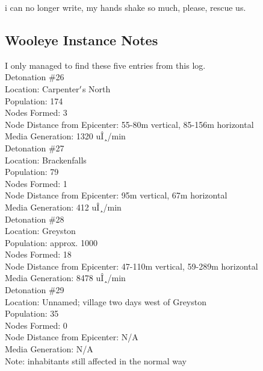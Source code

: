 \documentclass[12pt]{article}
\begin{document}
  
    i can no longer write, my hands shake so much, please, rescue us.\\

\newpage

\label{sec:lore/experiment1}
\subsection*{Wooleye Instance Notes}


  
    I only managed to find these five entries from this log.\\Detonation \#26\\Location: Carpenter$\rq$s North\\Population: 174\\Nodes Formed: 3\\Node Distance from Epicenter: 55-80m vertical, 85-156m horizontal\\Media Generation: 1320 uÎ¸/min\\


  
    Detonation \#27\\Location: Brackenfalls\\Population: 79\\Nodes Formed: 1\\Node Distance from Epicenter: 95m vertical, 67m horizontal\\Media Generation: 412 uÎ¸/min\\


  
    Detonation \#28\\Location: Greyston\\Population: approx. 1000\\Nodes Formed: 18\\Node Distance from Epicenter: 47-110m vertical, 59-289m horizontal\\Media Generation: 8478 uÎ¸/min\\


  
    Detonation \#29\\Location: Unnamed; village two days west of Greyston\\Population: 35\\Nodes Formed: 0\\Node Distance from Epicenter: N/A\\Media Generation: N/A\\Note: inhabitants still affected in the normal way\\
\end{document}
